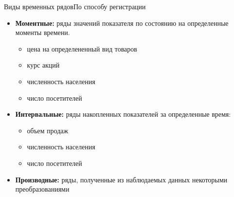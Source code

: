 \documentclass[10pt,pdf,utf8,hyperref={unicode},aspectratio=169]{beamer}
\begin{document}
\begin{frame}{Виды временных рядов}{По способу регистрации}

\begin{itemize}
	\item \textbf{Моментные:} ряды значений показателя по состоянию на определенные моменты времени. 
	\begin{itemize}
		\item цена на определененный вид товаров
		\item курс акций
		\item численность населения
		\item число посетителей
	\end{itemize}
	\item \textbf{Интервальные:} ряды накопленных показателей за определенные время:
	\begin{itemize}
		\item объем продаж
		\item численность населения
		\item число посетителей
	\end{itemize}
	\item \textbf{Производные:} ряды, полученные из наблюдаемых данных некоторыми преобразованиями
\end{itemize}

% 
% 

\end{frame}
\end{document}
